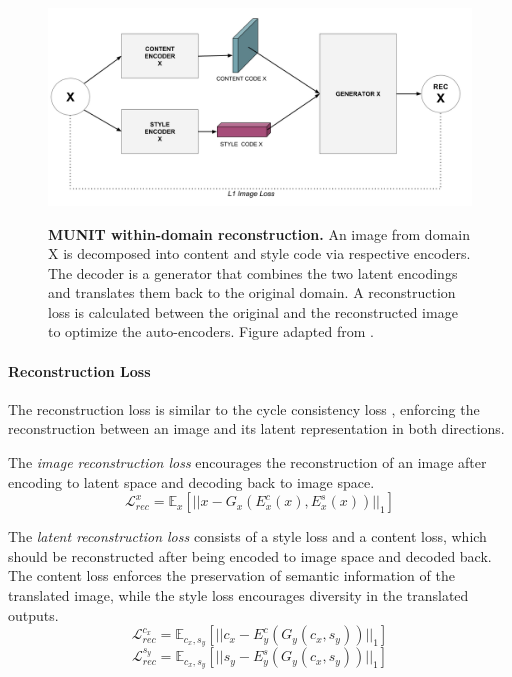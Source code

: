 \documentclass{article}
\begin{document}
\begin{figure}[h]
\centering
{\includegraphics[width=\linewidth]{GAN/munit_enc}}
\caption{\label{fig:munit_enc} \textbf{MUNIT within-domain reconstruction.}  An image from domain X is decomposed into content and style code via respective encoders. The decoder is a generator that combines the two latent encodings and translates them back to the original domain. A reconstruction loss is calculated between the original and the reconstructed image to optimize the auto-encoders. Figure adapted from \cite{huang_multimodal_2018}.}
\end{figure}

\paragraph{Reconstruction Loss}
The reconstruction loss is similar to the cycle consistency loss \cite{zhu_unpaired_2017}, enforcing the reconstruction between an image and its latent representation in both directions. 

The \textit{image reconstruction loss} encourages the reconstruction of an image after encoding to latent space and decoding back to image space.
\begin{equation}
\mathcal{L}^{x}_{rec} = \mathbb{E}_{x}[||x - G_{x}(E^{c}_{x}(x), E^{s}_{x}(x))||_{1}]
\end{equation}

The \textit{latent reconstruction loss} consists of a style loss and a content loss, which should be reconstructed after being encoded to image space and decoded back. The content loss enforces the preservation of semantic information of the translated image, while the style loss encourages diversity in the translated outputs.
\begin{equation}
\mathcal{L}^{c_{x}}_{rec} = \mathbb{E}_{c_{x}, s_{y}}[||c_{x} - E^{c}_{y}(G_{y}(c_{x},s_{y}))||_{1}]
\end{equation}
\begin{equation}
\mathcal{L}^{s_{y}}_{rec} = \mathbb{E}_{c_{x}, s_{y}}[||s_{y} - E^{s}_{y}(G_{y}(c_{x},s_{y}))||_{1}]
\end{equation}
\end{document}

